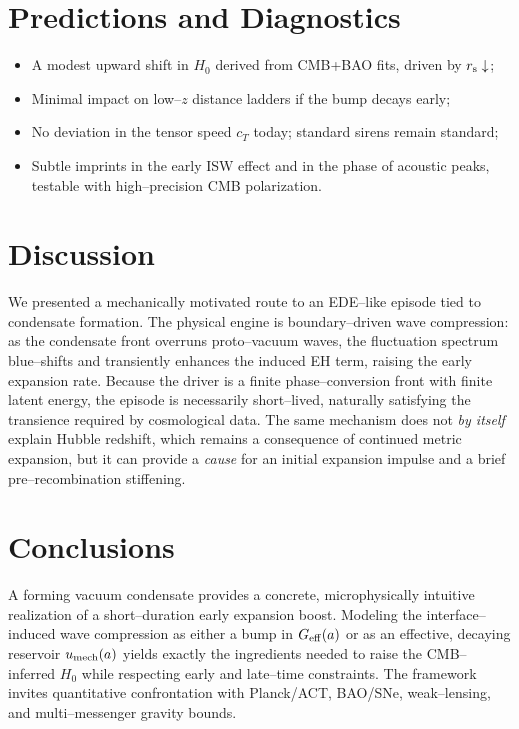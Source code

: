 \documentclass[11pt,a4paper]{article}
\newcommand{\rs}{r_{\rm s}}
\newcommand{\Geff}{G_{\rm eff}}
\begin{document}
\section{Predictions and Diagnostics}
\begin{itemize}
    \item A modest upward shift in $H_0$ derived from CMB+BAO fits, driven by $\rs\downarrow$;
    \item Minimal impact on low--$z$ distance ladders if the bump decays early;
    \item No deviation in the tensor speed $c_T$ today; standard sirens remain standard;
    \item Subtle imprints in the early ISW effect and in the phase of acoustic peaks, testable with high--precision CMB polarization.
\end{itemize}

\section{Discussion}
We presented a mechanically motivated route to an EDE--like episode tied to condensate formation. The physical engine is boundary--driven wave compression: as the condensate front overruns proto--vacuum waves, the fluctuation spectrum blue--shifts and transiently enhances the induced EH term, raising the early expansion rate. Because the driver is a finite phase--conversion front with finite latent energy, the episode is necessarily short--lived, naturally satisfying the transience required by cosmological data. The same mechanism does not \emph{by itself} explain Hubble redshift, which remains a consequence of continued metric expansion, but it can provide a \emph{cause} for an initial expansion impulse and a brief pre--recombination stiffening.

\section*{Conclusions}
A forming vacuum condensate provides a concrete, microphysically intuitive realization of a short--duration early expansion boost. Modeling the interface--induced wave compression as either a bump in $\Geff(a)$ or as an effective, decaying reservoir $u_{\rm mech}(a)$ yields exactly the ingredients needed to raise the CMB--inferred $H_0$ while respecting early and late--time constraints. The framework invites quantitative confrontation with Planck/ACT, BAO/SNe, weak--lensing, and multi--messenger gravity bounds.
\end{document}
